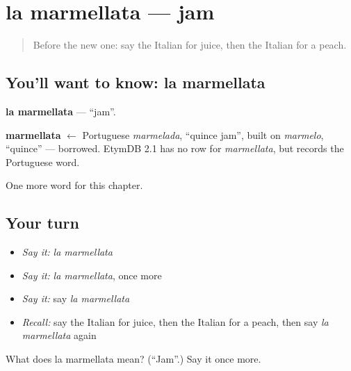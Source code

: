 \section[la marmellata]{la marmellata — jam}

\label{lesson:IT-C110-marmellata}



\begin{quote}
Before the new one: say the Italian for juice, then the Italian for a peach.
\end{quote}

\subsection*{You'll want to know: la marmellata}
\textbf{la marmellata} — \textquotedblleft{}jam\textquotedblright{}.

\begin{cousinweb}
\textbf{marmellata} $\leftarrow$ Portuguese \emph{marmelada}, \textquotedblleft{}quince jam\textquotedblright{}, built on \emph{marmelo}, \textquotedblleft{}quince\textquotedblright{} — borrowed. EtymDB 2.1 has no row for \emph{marmellata}, but records the Portuguese word.
\end{cousinweb}

\begin{grammarlens}[title={What you've built}]
One more word for this chapter.
\end{grammarlens}

\subsection*{Your turn}
\begin{itemize}
\raggedright
  \item \emph{Say it:} \emph{la marmellata}
  \item \emph{Say it:} \emph{la marmellata}, once more
  \item \emph{Say it:} say \emph{la marmellata}
  \item \emph{Recall:} say the Italian for juice, then the Italian for a peach, then say \emph{la marmellata} again
\end{itemize}

\begin{tcolorbox}[breakable,colback=teal!4,colframe=teal!35!black,title={Before you move on}]
What does la marmellata mean? (\textquotedblleft{}Jam\textquotedblright{}.) Say it once more.
\end{tcolorbox}
